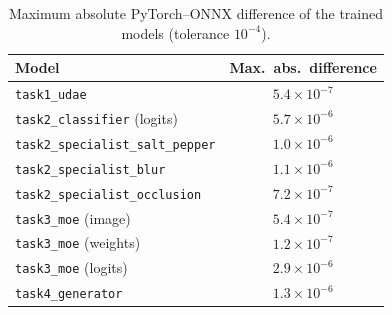 \documentclass[conference]{IEEEtran}
\begin{document}
\begin{table}[t]
\centering
\caption{Maximum absolute PyTorch--ONNX difference of the trained models
(tolerance $10^{-4}$).}
\label{tab:onnx}
\footnotesize
\begin{tabular}{lc}
\toprule
Model & Max.\ abs.\ difference \\
\midrule
\texttt{task1\_udae}                   & $5.4\times10^{-7}$ \\
\texttt{task2\_classifier} (logits)    & $5.7\times10^{-6}$ \\
\texttt{task2\_specialist\_salt\_pepper} & $1.0\times10^{-6}$ \\
\texttt{task2\_specialist\_blur}       & $1.1\times10^{-6}$ \\
\texttt{task2\_specialist\_occlusion}  & $7.2\times10^{-7}$ \\
\texttt{task3\_moe} (image)            & $5.4\times10^{-7}$ \\
\texttt{task3\_moe} (weights)          & $1.2\times10^{-7}$ \\
\texttt{task3\_moe} (logits)           & $2.9\times10^{-6}$ \\
\texttt{task4\_generator}              & $1.3\times10^{-6}$ \\
\bottomrule
\end{tabular}
\\[3pt]
\end{table}
\end{document}
